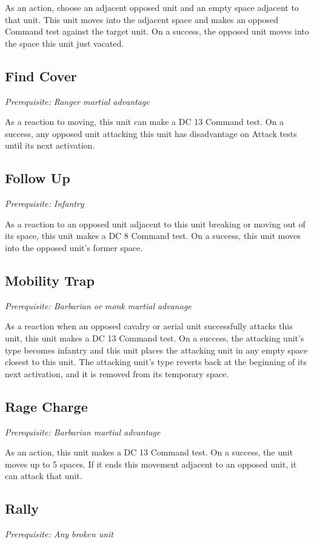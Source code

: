 \documentclass[10pt,a4paper,twoside,bg=print,twocolumn,openany,nodeprecatedcode]{dndbook}
\begin{document}
As an action, choose an adjacent opposed unit and an empty space adjacent to that unit. This unit moves into the adjacent space and makes an opposed Command test against the target unit. On a success, the opposed unit moves into the space this unit just vacated.

\subsection{Find Cover}
\textit{Prerequisite: Ranger martial advantage}

As a reaction to moving, this unit can make a DC 13 Command test. On a success, any opposed unit attacking this unit has disadvantage on Attack tests until its next activation.

\subsection{Follow Up}
\textit{Prerequisite: Infantry}

As a reaction to an opposed unit adjacent to this unit breaking or moving out of its space, this unit makes a DC 8 Command test. On a success, this unit moves into the opposed unit's former space.

\subsection{Mobility Trap}
\textit{Prerequisite: Barbarian or monk martial advanage}

As a reaction when an opposed cavalry or aerial unit successfully attacks this unit, this unit makes a DC 13 Command test. On a success, the attacking unit's type becomes infantry and this unit places the attacking unit in any empty space closest to this unit. The attacking unit's type reverts back at the beginning of its next activation, and it is removed from its temporary space.

\subsection{Rage Charge}
\textit{Prerequisite: Barbarian martial advantage}

As an action, this unit makes a DC 13 Command test. On a success, the unit moves up to 5 spaces. If it ends this movement adjacent to an opposed unit, it can attack that unit.

\subsection{Rally}
\textit{Prerequisite: Any broken unit}
\end{document}
